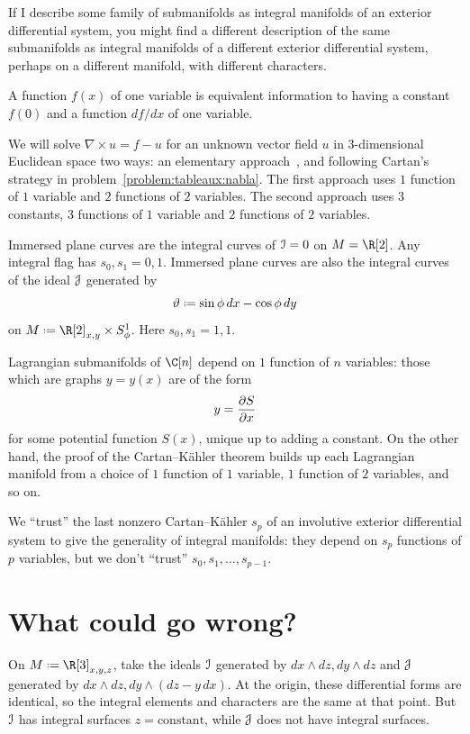%
If I describe some family of submanifolds as integral manifolds of an exterior differential system, you might find a different description of the same submanifolds as integral manifolds of a different exterior differential system, perhaps on a different manifold, with different characters.
\begin{example} 
A function \(f(x)\) of one variable is equivalent information to having a constant \(f(0)\) and a function \(df/dx\) of one variable.
\end{example}
\begin{example}
We will solve \(\nabla \times u=f-u\) for an unknown vector field \(u\) in \(3\)-dimensional Euclidean space two ways: an elementary approach~, and following Cartan's strategy in problem~\vref{problem:tableaux:nabla}.
The first approach uses \(1\) function of \(1\) variable and \(2\) functions of \(2\) variables.
The second approach uses \(3\) constants, \(3\) functions of \(1\) variable and \(2\) functions of \(2\) variables.
\end{example}
\begin{example}Immersed plane curves are the integral curves of \(\mathcal{I}=0\) on \(M=\R[2]\).
Any integral flag has \(s_0,s_1=0,1\).
Immersed plane curves are also the integral curves of the ideal \(\mathcal{J}\) generated by
\[
\vartheta \defeq \sin \phi \, dx - \cos \phi \, dy
\]
on \(M\defeq \R[2]_{x,y} \times S^1_{\phi}\).
Here \(s_0,s_1=1,1\).
\end{example}
\begin{example}
Lagrangian submanifolds of \(\C[n]\) depend on \(1\) function of \(n\) variables: those which are graphs \(y=y(x)\) are of the form
\[
y = \pderiv{S}{x}
\]
for some potential function \(S(x)\), unique up to adding a constant.
On the other hand, the proof of the Cartan--K\"ahler theorem builds up each Lagrangian manifold from a choice of \(1\) function of \(1\) variable, \(1\) function of \(2\) variables, and so on.
\end{example}
We ``trust'' the last nonzero Cartan--K\"ahler \(s_p\) of an involutive exterior differential system to give the generality of integral manifolds: they depend on \(s_p\) functions of \(p\) variables, but we don't ``trust'' \(s_0, s_1, \dots, s_{p-1}\).

\section{What could go wrong?}
\begin{example}
On \(M\defeq\R[3]_{x,y,z}\), take the ideals \(\mathcal{I}\) generated by \(dx\wedge dz, dy\wedge dz\) and \(\mathcal{J}\) generated by \(dx\wedge dz, dy\wedge(dz-y \, dx)\).
At the origin, these differential forms are identical, so the integral elements and characters are the same at that point.
But \(\mathcal{I}\) has integral surfaces \(z=\text{constant}\), while \(\mathcal{J}\) does not have integral surfaces.
\end{example}

